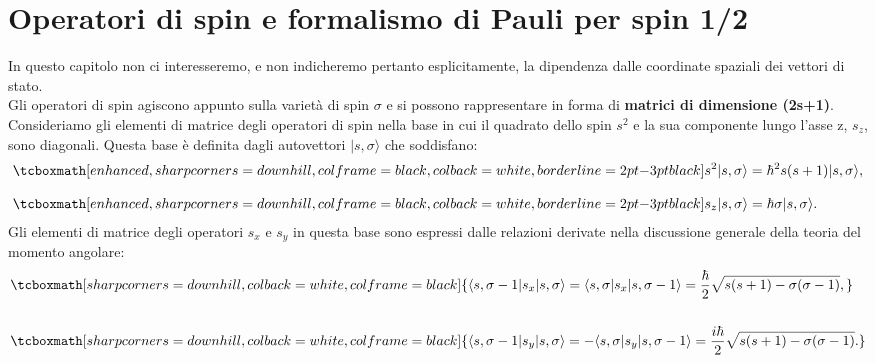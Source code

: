 \documentclass[a4paper,12pt,oneside]{book}
\begin{document}
\section{Operatori di spin e formalismo di Pauli per spin 1/2}
In questo capitolo non ci interesseremo, e non indicheremo pertanto esplicitamente, la dipendenza dalle coordinate spaziali dei vettori di stato.\\

Gli operatori di spin agiscono appunto sulla varietà di spin $\sigma$ e si possono rappresentare in forma di \textbf{matrici di dimensione (2s+1)}.\\

Consideriamo gli elementi di matrice degli operatori di spin nella base in cui il quadrato dello spin $s^{2}$ e la sua componente lungo l'asse z, $s_{z}$, sono diagonali. Questa base è definita dagli autovettori $|s,\sigma\rangle$ che soddisfano:
	\begin{align}
		& \tcboxmath[enhanced, sharp corners=downhill, colframe=black, colback=white, borderline={2pt}{-3pt}{black}]{
			s^{2} |s, \sigma\rangle =\hbar^{2}s(s+1)|s, \sigma\rangle ,
			}\\[0.3cm]
		& \tcboxmath[enhanced, sharp corners=downhill, colframe=black, colback=white, borderline={2pt}{-3pt}{black}]{
			s_{z} |s, \sigma\rangle =\hbar \sigma |s, \sigma\rangle . 
			}
	\end{align}
Gli elementi di matrice degli operatori $s_{x}$ e $s_{y}$ in questa base sono espressi dalle relazioni derivate  nella discussione generale della teoria del momento angolare:
	\begin{align}
		& \tcboxmath[sharp corners=downhill, colback=white, colframe=black]{
	\langle s, \sigma -1\vert s_{x}\vert s, \sigma\rangle = \langle s, \sigma\vert s_{x}\vert s, \sigma -1\rangle =\frac{\hbar}{2}\sqrt{s(s+1)-\sigma(\sigma-1)} , \nonumber }\\
\\
		& \tcboxmath[sharp corners=downhill, colback=white, colframe=black]{\langle s, \sigma -1\vert s_{y}\vert s, \sigma\rangle =- \langle s, \sigma\vert s_{y}\vert s, \sigma -1\rangle =\frac{i\hbar}{2}\sqrt{s(s+1)-\sigma(\sigma-1)} . \nonumber }\\
	\end{align}\\
	
\end{document}
